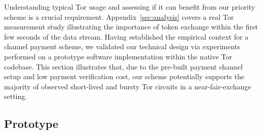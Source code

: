 Understanding typical Tor usage and assessing if it can benefit from our priority scheme is a crucial requirement.
Appendix~\ref{sec:analysis} covers a real Tor measurement study illustrating the importance of token exchange within the first few seconds of the data stream.
Having established the empirical context for a channel payment scheme, we validated our technical design via experiments performed on a prototype software implementation within the native Tor codebase.
This section illustrates that, due to the pre-built payment channel setup and low payment verification cost, our scheme potentially supports the majority of observed short-lived and bursty Tor circuits in a near-fair-exchange setting.

\subsection{Prototype}

